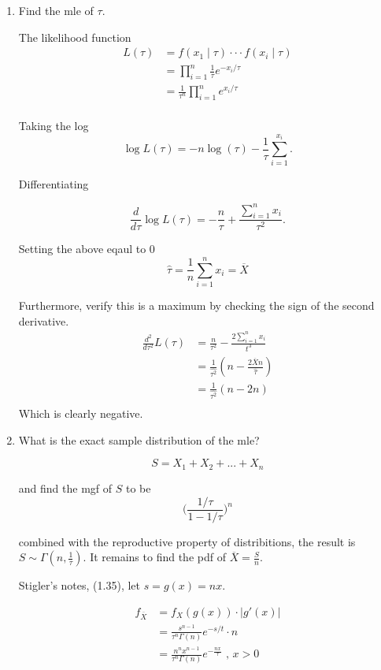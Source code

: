 \documentclass{tufte-book}
\theoremstyle{mytheoremstyle}
\theoremstyle{mylemstyle}
\theoremstyle{mydefstyle}
\begin{document}
\begin{enumerate}

\item Find the mle of $\tau$.


The likelihood function
\begin{align*}
L(\tau) &= f(x_1\mid \tau) \cdot \cdot \cdot f(x_i\mid \tau)\\
&=\prod_{i=1}^n \frac{1}{\tau}e^{-x_i/\tau}\\
&= \frac{1}{\tau^n} \prod_{i=1}^{n}e^{x_i/\tau}\\
\end{align*}

Taking the log
\[ \log L(\tau) =  -n\log(\tau) - \frac{1}{\tau} \sum_{i=1}^{x_i}. \]

Differentiating

\[ \frac{d}{d\tau} \log L(\tau) = -\frac{n}{\tau} + \frac{\sum_{i=1}^n x_i}{\tau^2}. \]

Setting the above eqaul to $0$
\[ \hat{\tau} = \frac{1}{n} \sum_{i=1}^n x_i = \overline{X} \]

Furthermore, verify this is a maximum by checking the sign of the second derivative.
\begin{align*}
\frac{d^2}{d\tau^2} L(\tau) &= \frac{n}{\tau^2} - \frac{2 \sum_{i=1}^n x_i}{t^3}\\
&= \frac{1}{\hat{\tau^2}}(n - \frac{2 \overline{X}n}{\hat{\tau}})\\
&= \frac{1}{\hat{\tau^2}}(n-2n)\\
\end{align*}
Which is clearly negative.

\item What is the exact sample distribution of the mle?


\[S = X_1 + X_2 + ... + X_n \]

and find the mgf of $S$ to be
\[ \Big(\frac{1/\tau}{1 - 1/\tau}\Big)^n \]

combined with the reproductive property of distribitions, the result is $S \sim \Gamma(n, \frac{1}{\tau})$.  It remains to find the pdf of $\overline{X} = \frac{S}{n}$.

 Stigler's notes, (1.35), let $s = g(x) = nx$.

\begin{align*}
f_{\overline{X}} &= f_X(g(x)) \cdot |g'(x)| \\
&= \frac{s^{n-1}}{\tau^n \Gamma(n)} e^{-s/t} \cdot n\\
&= \frac{n^n x^{n-1}}{\tau^n \Gamma(n)} e^{-\frac{nx}{\tau}} \text{ , } x>0\\
\end{align*}


\end{enumerate}
\end{document}
